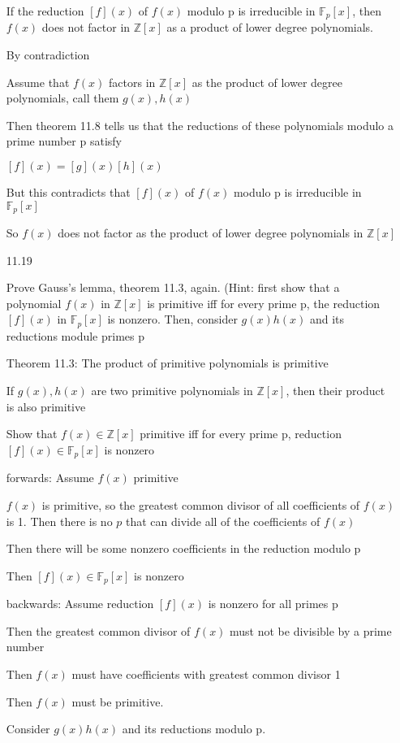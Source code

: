 \documentclass[12pt]{article}
\begin{document}
\begin{itemize}
If the reduction $[f](x)$ of $f(x)$ modulo p is irreducible in $\mathbb{F}_p[x]$, then $f(x)$ does not factor in $\mathbb{Z}[x]$ as a product of lower degree polynomials.

By contradiction

Assume that $f(x)$ factors in $\mathbb{Z}[x]$ as the product of lower degree polynomials, call them $g(x),h(x)$

Then theorem 11.8 tells us that the reductions of these polynomials modulo a prime number p satisfy

$[f](x) = [g](x)[h](x)$

But this contradicts that $[f](x)$ of $f(x)$ modulo p is irreducible in $\mathbb{F}_p[x]$

So $f(x)$ does not factor as the product of lower degree polynomials in $\mathbb{Z}[x]$


\newpage
\item[11.19]

Prove Gauss's lemma, theorem 11.3, again. (Hint: first show that a polynomial $f(x)$ in $\mathbb{Z}[x]$ is primitive iff for every prime p, the reduction $[f](x)$ in $\mathbb{F}_p[x]$ is nonzero. Then, consider $g(x)h(x)$ and its reductions module primes p

Theorem 11.3: The product of primitive polynomials is primitive 

If $g(x), h(x)$ are two primitive polynomials in $\mathbb{Z}[x]$, then their product is also primitive

Show that $f(x) \in\mathbb{Z}[x]$ primitive iff for every prime p, reduction $[f](x) \in\mathbb{F}_p[x]$ is nonzero

forwards: Assume $f(x)$ primitive

$f(x)$ is primitive, so the greatest common divisor of all coefficients of $f(x)$ is 1. Then there is no $p$ that can divide all of the coefficients of $f(x)$

Then there will be some nonzero coefficients in the reduction modulo p

Then $[f](x) \in\mathbb{F}_p[x]$ is nonzero

backwards: Assume reduction $[f](x)$ is nonzero for all primes p

Then the greatest common divisor of $f(x)$ must not be divisible by a prime number

Then $f(x)$ must have coefficients with greatest common divisor 1

Then $f(x)$ must be primitive.

Consider $g(x)h(x)$ and its reductions modulo p.


\end{itemize}
\end{document}
